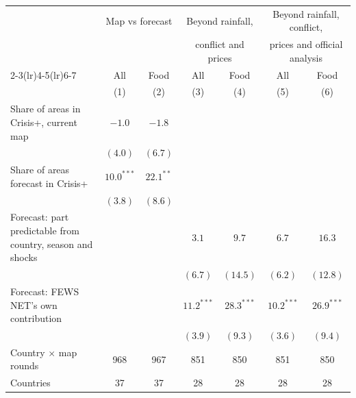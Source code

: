 \begin{tabular}{lcccccc}
\toprule
 & \multicolumn{2}{c}{Map vs forecast} & \multicolumn{2}{c}{Beyond rainfall,} & \multicolumn{2}{c}{Beyond rainfall, conflict,} \\
 & \multicolumn{2}{c}{} & \multicolumn{2}{c}{conflict and prices} & \multicolumn{2}{c}{prices and official analysis} \\
\cmidrule(lr){2-3}\cmidrule(lr){4-5}\cmidrule(lr){6-7}
 & All & Food & All & Food & All & Food \\
 & (1) & (2) & (3) & (4) & (5) & (6) \\
\midrule
Share of areas in Crisis+, current map & $-1.0$ & $-1.8$ &  &  &  &  \\
 & $(4.0)$ & $(6.7)$ &  &  &  &  \\
Share of areas forecast in Crisis+ & $10.0^{***}$ & $22.1^{**}$ &  &  &  &  \\
 & $(3.8)$ & $(8.6)$ &  &  &  &  \\
Forecast: part predictable from country, season and shocks &  &  & $3.1$ & $9.7$ & $6.7$ & $16.3$ \\
 &  &  & $(6.7)$ & $(14.5)$ & $(6.2)$ & $(12.8)$ \\
Forecast: FEWS NET's own contribution &  &  & $11.2^{***}$ & $28.3^{***}$ & $10.2^{***}$ & $26.9^{***}$ \\
 &  &  & $(3.9)$ & $(9.3)$ & $(3.6)$ & $(9.4)$ \\
\midrule
Country $\times$ map rounds & 968 & 967 & 851 & 850 & 851 & 850 \\
Countries & 37 & 37 & 28 & 28 & 28 & 28 \\
\bottomrule
\end{tabular}